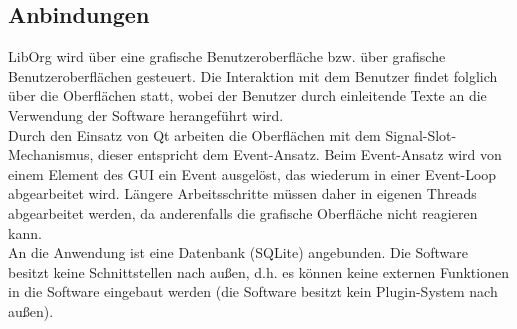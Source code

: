 \subsection{Anbindungen}
LibOrg wird über eine grafische Benutzeroberfläche bzw. über grafische Benutzeroberflächen gesteuert. Die Interaktion mit dem Benutzer findet folglich über die Oberflächen statt, wobei der Benutzer durch einleitende Texte an die Verwendung der Software herangeführt wird.\bigskip \\
Durch den Einsatz von Qt arbeiten die Oberflächen mit dem Signal-Slot-Mechanismus, dieser entspricht dem Event-Ansatz. Beim Event-Ansatz wird von einem Element des GUI ein Event ausgelöst, das wiederum in einer Event-Loop abgearbeitet wird. Längere Arbeitsschritte müssen daher in eigenen Threads abgearbeitet werden, da anderenfalls die grafische Oberfläche nicht reagieren kann.\bigskip \\
An die Anwendung ist eine Datenbank (SQLite) angebunden. Die Software besitzt keine Schnittstellen nach außen, d.h. es können keine externen Funktionen in die Software eingebaut werden (die Software besitzt kein Plugin-System nach außen).
